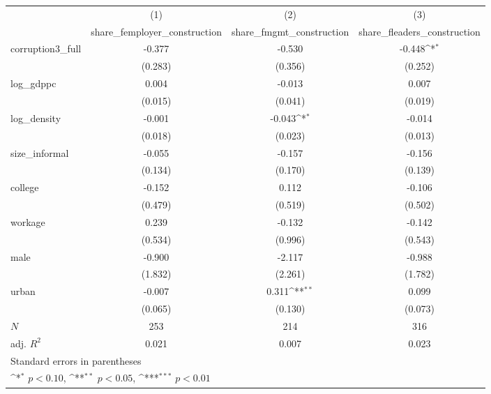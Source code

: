 {
\def\sym#1{\ifmmode^{#1}\else\(^{#1}\)\fi}
\begin{tabular}{l*{3}{c}}
\hline\hline
            &\multicolumn{1}{c}{(1)}&\multicolumn{1}{c}{(2)}&\multicolumn{1}{c}{(3)}\\
            &\multicolumn{1}{c}{share\_femployer\_construction}&\multicolumn{1}{c}{share\_fmgmt\_construction}&\multicolumn{1}{c}{share\_fleaders\_construction}\\
\hline
corruption3\_full&      -0.377         &      -0.530         &      -0.448\sym{*}  \\
            &     (0.283)         &     (0.356)         &     (0.252)         \\
[1em]
log\_gdppc   &       0.004         &      -0.013         &       0.007         \\
            &     (0.015)         &     (0.041)         &     (0.019)         \\
[1em]
log\_density &      -0.001         &      -0.043\sym{*}  &      -0.014         \\
            &     (0.018)         &     (0.023)         &     (0.013)         \\
[1em]
size\_informal&      -0.055         &      -0.157         &      -0.156         \\
            &     (0.134)         &     (0.170)         &     (0.139)         \\
[1em]
college     &      -0.152         &       0.112         &      -0.106         \\
            &     (0.479)         &     (0.519)         &     (0.502)         \\
[1em]
workage     &       0.239         &      -0.132         &      -0.142         \\
            &     (0.534)         &     (0.996)         &     (0.543)         \\
[1em]
male        &      -0.900         &      -2.117         &      -0.988         \\
            &     (1.832)         &     (2.261)         &     (1.782)         \\
[1em]
urban       &      -0.007         &       0.311\sym{**} &       0.099         \\
            &     (0.065)         &     (0.130)         &     (0.073)         \\
\hline
\(N\)       &         253         &         214         &         316         \\
adj. \(R^{2}\)&       0.021         &       0.007         &       0.023         \\
\hline\hline
\multicolumn{4}{l}{\footnotesize Standard errors in parentheses}\\
\multicolumn{4}{l}{\footnotesize \sym{*} \(p<0.10\), \sym{**} \(p<0.05\), \sym{***} \(p<0.01\)}\\
\end{tabular}
}
